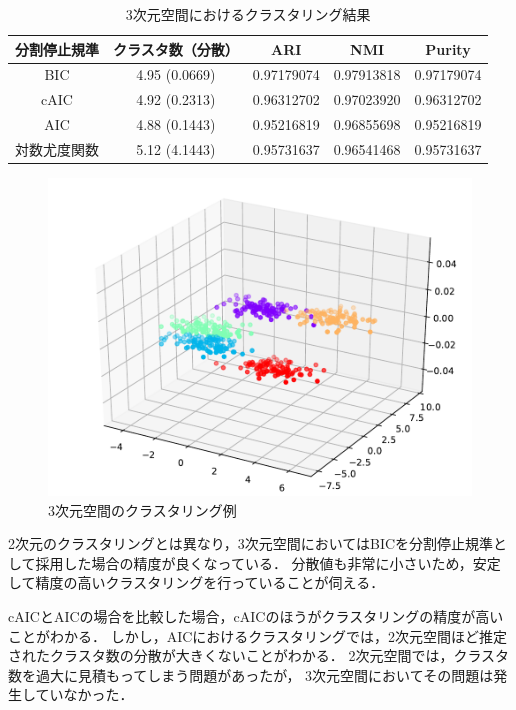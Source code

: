 \begin{table}[htb]
  \centering
  \caption{3次元空間におけるクラスタリング結果}
  \label{table:3dim}
  \begin{tabular}{|c|c|c|c|c|} \hline
    分割停止規準 & クラスタ数（分散） & ARI & NMI & Purity \\\hline
    BIC & 4.95 (0.0669) & 0.97179074 & 0.97913818 & 0.97179074\\
    cAIC & 4.92 (0.2313) & 0.96312702 & 0.97023920 & 0.96312702\\
    AIC & 4.88 (0.1443) & 0.95216819 & 0.96855698 & 0.95216819\\
    対数尤度関数 & 5.12 (4.1443) & 0.95731637 & 0.96541468 & 0.95731637\\\hline 
  \end{tabular}
\end{table}

\begin{figure}[htbp]
  \begin{center}
    \includegraphics[width=0.7\linewidth]{./img/BIC_3.pdf}
      \caption{3次元空間のクラスタリング例}
      \label{fig:3dim}
  \end{center}
\end{figure}
2次元のクラスタリングとは異なり，3次元空間においてはBICを分割停止規準として採用した場合の精度が良くなっている．
分散値も非常に小さいため，安定して精度の高いクラスタリングを行っていることが伺える．

cAICとAICの場合を比較した場合，cAICのほうがクラスタリングの精度が高いことがわかる．
しかし，AICにおけるクラスタリングでは，2次元空間ほど推定されたクラスタ数の分散が大きくないことがわかる．
2次元空間では，クラスタ数を過大に見積もってしまう問題があったが，
3次元空間においてその問題は発生していなかった．

